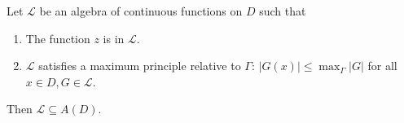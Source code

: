 
Let $\mathcal{L}$ be an algebra of continuous functions on $D$ such that
\begin{enumerate}
\item[(a)] The function $z$ is in $\mathcal{L}$.
\item[(b)] $\mathcal{L}$ satisfies a maximum principle relative to $\Gamma$: $|G(x)| \leq \max_{\Gamma} |G|$ for all $x \in D, G \in \mathcal{L}$.
\end{enumerate}
Then $\mathcal{L} \subseteq A(D)$.
